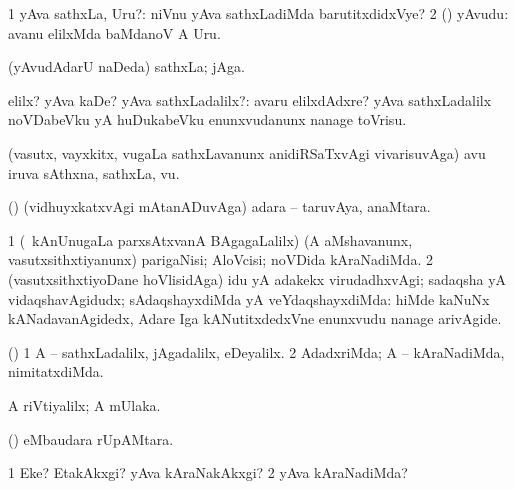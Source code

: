 \bentry
{}
\gl{\sanA}
\expl{}
\bmng
\bnum
\num{1} yAva sathxLa, Uru?:  niVnu yAva sathxLadiMda barutitxdidxVye? 
\num{2} (\AmA) yAvudu:  avanu elilxMda baMdanoV A Uru. 
\enum
\emng
\eentry

\bentry
{}
\gl{\nA}
\expl{}
\bmng
(yAvudAdarU naDeda) sathxLa; jAga. 
\emng
\eentry

\bentry
{} 
\gl{\kirxvi}
\expl{}
\bmng
elilx? yAva kaDe? yAva sathxLadalilx?:  avaru elilxdAdxre?  yAva sathxLadalilx noVDabeVku yA huDukabeVku enunxvudanunx nanage toVrisu. 
\emng
\eentry

\bentry
{}
\gl{\nA}
\expl{}
\bmng
(vasutx, vayxkitx, \mo vugaLa sathxLavanunx anidiRSaTxvAgi vivarisuvAga) avu iruva sAthxna, sathxLa, \mo vu. 
\emng
\eentry

\bentry
{} 
\gl{\saMavayx}
\expl{}
\bmng
(\aupa) (vidhuyxkatxvAgi mAtanADuvAga) adara -- taruvAya, anaMtara. 
\emng
\eentry

\bentry
{} 
\gl{\saMavayx}
\expl{}
\bmng
\bnum
\num{1} (\kanmu\ kAnUnugaLa parxsAtxvanA BAgagaLalilx) (A aMshavanunx, vasutxsithxtiyanunx) parigaNisi; AloVcisi; noVDida kAraNadiMda. 
\num{2} (vasutxsithxtiyoDane hoVlisidAga) idu yA adakekx virudadhxvAgi; sadaqsha yA vidaqshavAgidudx; sAdaqshayxdiMda yA veYdaqshayxdiMda:  hiMde kaNuNx kANadavanAgidedx, Adare Iga kANutitxdedxVne enunxvudu nanage arivAgide. 
\enum
\emng
\eentry

\bentry
{} 
\gl{\saMavayx}
\expl{}
\bmng
(\pArxparx) 
\bnum
\num{1} A -- sathxLadalilx, jAgadalilx, eDeyalilx. 
\num{2} AdadxriMda; A -- kAraNadiMda, nimitatxdiMda. 
\enum
\emng
\eentry

\bentry
{} 
\gl{\saMavayx}
\expl{}
\bmng
A riVtiyalilx; A mUlaka. 
\emng
\eentry

\bentry
{} 
\expl{}
\bmng
(\kAparx)  eMbaudara rUpAMtara. 
\emng
\eentry

\bentry
{} 
\gl{\kirxvi}
\expl{(\pArxparx) }
\bmng
\bnum
\num{1} Eke? EtakAkxgi? yAva kAraNakAkxgi? 
\num{2} yAva kAraNadiMda? 
\enum
\emng
\eentry

